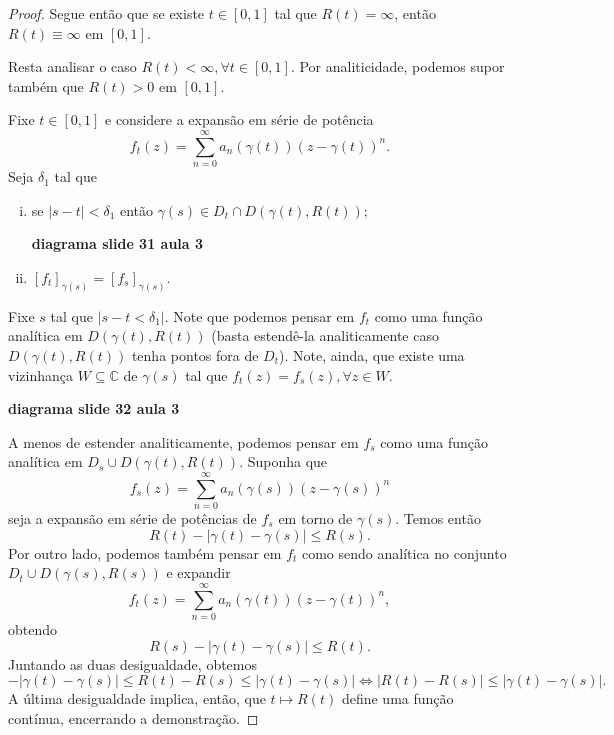 \begin{proof}
Segue então que se existe $t\in [0,1]$ tal que $R(t) = \infty$, então
$R(t) \equiv\infty$ em $[0,1]$.

Resta analisar o caso $R(t) < \infty, \forall t\in[0,1]$. Por analiticidade, podemos
supor também que $R(t) > 0$ em $[0,1]$.

Fixe $t\in [0,1]$ e considere a expansão em série de potência
\begin{equation*}
    f_t(z) = \sum_{n=0}^{\infty} a_n(\gamma(t))(z-\gamma(t))^n.
\end{equation*}
Seja $\delta_1$ tal que 
\begin{enumerate}[i)]
    \item se $|s-t|<\delta_1$ então $\gamma(s)\in D_t\cap D(\gamma(t), R(t));$
    
    \begin{center}
        \textbf{diagrama slide 31 aula 3}
    \end{center}
    
    \item $[f_t]_{\gamma(s)} = [f_s]_{\gamma(s)}$.
\end{enumerate}
Fixe $s$ tal que $|s-t<\delta_1|$. Note que podemos pensar em $f_t$ como uma 
função analítica em $D(\gamma(t), R(t))$ (basta estendê-la analiticamente caso
$D(\gamma(t), R(t))$ tenha pontos fora de $D_t$). Note, ainda, que existe uma 
vizinhança $W\subseteq\mathbb{C}$ de $\gamma(s)$ tal que 
$f_t(z) = f_s(z), \forall z\in W$.

\begin{center}
    \textbf{diagrama slide 32 aula 3}
\end{center}

A menos de estender analiticamente, podemos pensar em $f_s$ como uma função analítica
em $D_s\cup D(\gamma(t), R(t))$. Suponha que
\begin{equation*}
    f_s(z) = \sum_{n=0}^\infty a_n(\gamma(s))(z-\gamma(s))^n
\end{equation*}
seja a expansão em série de potências de $f_s$ em torno de $\gamma(s)$. Temos então
\begin{equation*}
    R(t) - |\gamma(t) - \gamma(s)| \leq R(s).
\end{equation*}
Por outro lado, podemos também pensar em $f_t$ como sendo analítica no conjunto
$D_t\cup D(\gamma(s), R(s))$ e expandir
\begin{equation*}
    f_t(z) = \sum_{n=0}^\infty a_n(\gamma(t))(z-\gamma(t))^n,
\end{equation*}
obtendo
\begin{equation*}
    R(s) - |\gamma(t) - \gamma(s)| \leq R(t).
\end{equation*}
Juntando as duas desigualdade, obtemos
\begin{equation*}
    -|\gamma(t) - \gamma(s)| \leq R(t) - R(s) \leq |\gamma(t) - \gamma(s)| 
    \iff
    |R(t) - R(s)| \leq |\gamma(t) - \gamma(s)|.
\end{equation*}
A última desigualdade implica, então, que $t\mapsto R(t)$ define uma função contínua,
encerrando a demonstração.
\end{proof}

